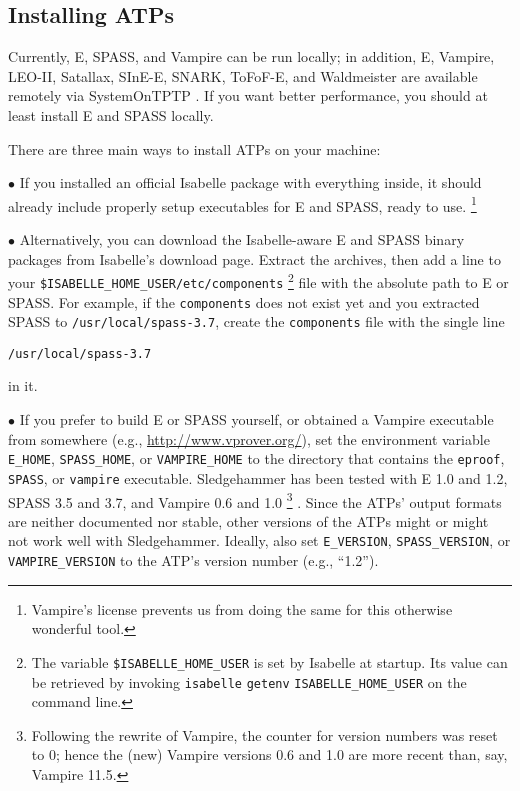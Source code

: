 \documentclass[a4paper,12pt]{article}
\begin{document}
\subsection{Installing ATPs}

Currently, E, SPASS, and Vampire can be run locally; in addition, E, Vampire,
LEO-II, Satallax, SInE-E, SNARK, ToFoF-E, and Waldmeister are available remotely
via System\-On\-TPTP \cite{sutcliffe-2000}. If you want better performance, you
should at least install E and SPASS locally.

There are three main ways to install ATPs on your machine:

\begin{enum}
\item[$\bullet$] If you installed an official Isabelle package with everything
inside, it should already include properly setup executables for E and SPASS,
ready to use.%
\footnote{Vampire's license prevents us from doing the same for this otherwise
wonderful tool.}

\item[$\bullet$] Alternatively, you can download the Isabelle-aware E and SPASS
binary packages from Isabelle's download page. Extract the archives, then add a
line to your \texttt{\$ISABELLE\_HOME\_USER/etc/components}%
\footnote{The variable \texttt{\$ISABELLE\_HOME\_USER} is set by Isabelle at
startup. Its value can be retrieved by invoking \texttt{isabelle}
\texttt{getenv} \texttt{ISABELLE\_HOME\_USER} on the command line.}
file with the absolute
path to E or SPASS. For example, if the \texttt{components} does not exist yet
and you extracted SPASS to \texttt{/usr/local/spass-3.7}, create the
\texttt{components} file with the single line

\prew
\texttt{/usr/local/spass-3.7}
\postw

in it.

\item[$\bullet$] If you prefer to build E or SPASS yourself, or obtained a
Vampire executable from somewhere (e.g., \url{http://www.vprover.org/}),
set the environment variable \texttt{E\_HOME}, \texttt{SPASS\_HOME}, or
\texttt{VAMPIRE\_HOME} to the directory that contains the \texttt{eproof},
\texttt{SPASS}, or \texttt{vampire} executable. Sledgehammer has been tested
with E 1.0 and 1.2, SPASS 3.5 and 3.7, and Vampire 0.6 and 1.0%
\footnote{Following the rewrite of Vampire, the counter for version numbers was
reset to 0; hence the (new) Vampire versions 0.6 and 1.0 are more recent than,
say, Vampire 11.5.}%
. Since the ATPs' output formats are neither documented nor stable, other
versions of the ATPs might or might not work well with Sledgehammer. Ideally,
also set \texttt{E\_VERSION}, \texttt{SPASS\_VERSION}, or
\texttt{VAMPIRE\_VERSION} to the ATP's version number (e.g., ``1.2'').
\end{enum}
\end{document}
